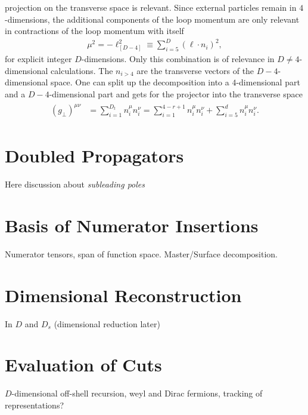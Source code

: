 projection on the transverse space is relevant. Since external
particles remain in $4$-dimensions, the additional components of the
loop momentum are only relevant in contractions of the loop momentum
with itself
\begin{align}
  \mu^2 = -\ell_{[D-4]}^2 \equiv \sum_{i=5}^D(\ell \cdot n_i)^2,
\end{align}
for explicit integer $D$-dimensions. Only this combination is of
relevance in $D\neq 4$-dimensional calculations. The $n_{i>4}$ are the transverse
vectors of the $D-4$-dimensional space. One can split up the
decomposition into a $4$-dimensional part and a $D-4$-dimensional part
and gets for the projector into the transverse space
\begin{align}\label{eq:metricprond}
\begin{split}
  (g_\perp)^{\mu\nu} &=  \sum_{i=1}^{D_t}n_i^\mu n_i^\nu=\sum_{i=1}^{4-r+1}n_i^\mu n_i^\nu +  \sum_{i=5}^{d}n_i^\mu n_i^\nu.
\end{split}
\end{align}


\section{Doubled Propagators}
Here discussion about \textit{subleading poles}

\section{Basis of Numerator Insertions}
Numerator tensors, span of function space. Master/Surface decomposition.



\section{Dimensional Reconstruction}
 In $D$ and $D_s$ (dimensional reduction later)

\section{Evaluation of Cuts}
$D$-dimensional off-shell recursion, weyl and Dirac fermions, tracking of representations?



